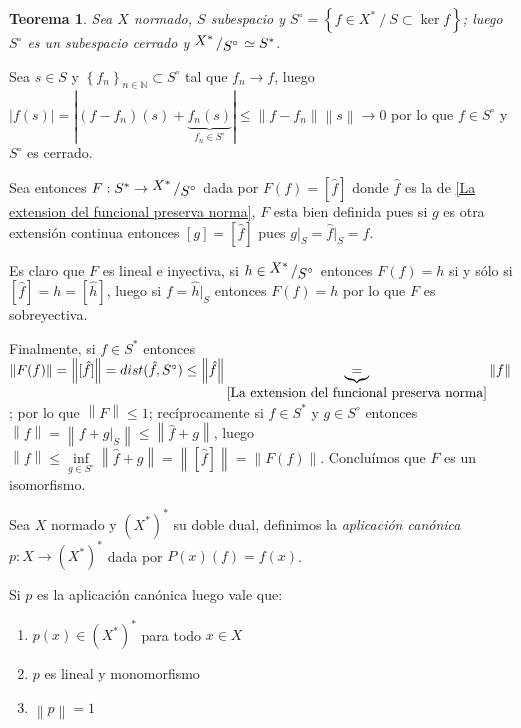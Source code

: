 \documentclass[11pt]{article}
\newcommand{\N}{{\mathbb{N}}}
\newcommand{\ddual}[1]{\left(#1^{\ast}\right)^{\ast}}
\newcommand{\norm}[1]{\left\lVert#1\right\rVert}
\newcommand{\abs}[1]{\left\lvert#1\right\rvert}
\newcommand{\sett}[1]{\left\lbrace#1\right\rbrace}
\newcommand{\quotient}[2]{{\raisebox{.2em}{$#1$}\left/\raisebox{-.2em}{$#2$}\right.}}
\newtheorem{theorem}{Teorema}
\numberwithin{theorem}{subsection}
\newenvironment{proof}[1][Demostraci\'on]{\begin{trivlist}
		\item[\hskip \labelsep {\bfseries #1}]}{\end{trivlist}}
\newenvironment{definition}[1][Definici\'on]{\begin{trivlist}
		\item[\hskip \labelsep {\bfseries #1}]}{\end{trivlist}}
\newenvironment{remark}[1][Observaci\'on]{\begin{trivlist}
		\item[\hskip \labelsep {\bfseries #1}]}{\end{trivlist}}
\newcommand{\qed}{\nobreak \ifvmode \relax \else
	\ifdim\lastskip<1.5em \hskip-\lastskip
	\hskip1.5em plus0em minus0.5em \fi \nobreak
	\vrule height0.75em width0.5em depth0.25em\fi}
\begin{document}
\begin{theorem}
	\label{El dual de un subespacio es el cociente del dual por el polar}
	Sea $X$ normado, $S$ subespacio y $S^{\circ} = \sett{f \in X^{\ast} \ / \ S \subset \ker f}$; luego $S^{\circ}$ es un subespacio cerrado y $\quotient{X^{\ast}}{S^{\circ}} \simeq S^{\ast}$.
\end{theorem}

\begin{proof}
	Sea $s \in S$ y $\sett{f_n}_{n \in \N} \subset S^{\circ}$ tal que $f_n \rightarrow f$, luego $\abs{f(s)} = \abs{(f-f_n)(s) + \underbrace{f_n(s)}_{f_n \in S^{\circ}}} \leq \norm{f-f_n}\norm{s} \rightarrow 0 $ por lo que $f \in S^{\circ}$ y $S^{\circ}$ es cerrado.
	
	Sea entonces $F : S^{\ast} \rightarrow \quotient{X^{\ast}}{S^{\circ}}$ dada por $F(f) = [\hat{f}]$ donde $\hat{f}$ es la de \ref{La extension del funcional preserva norma}, $F$ esta bien definida pues si $g$ es otra extensi\'on continua entonces $[g] = [\hat{f}]$ pues $g \vert_{S} = \hat{f} \vert_{S} = f$.
	
	Es claro que $F$ es lineal e inyectiva, si $h \in \quotient{X^{\ast}}{S^{\circ}}$ entonces $F(f) = h$ si y s\'olo si $[\hat{f}] = h = [\hat{h}]$, luego si $f = \hat{h} \vert_{S}$ entonces $F(f)=h$ por lo que $F$ es sobreyectiva.
	
	Finalmente, si $f \in S^{\ast}$ entonces $\norm{F(f)} = \norm{[\hat{f}]} = dist (\hat{f}, S^{\circ}) \leq \norm{\hat{f}} \underbrace{=}_{\ref{La extension del funcional preserva norma}} \norm{f}$; por lo que $\norm{F} \leq 1$; rec\'iprocamente si $f \in S^{\ast}$ y $g \in S^{\circ}$ entonces $\norm{f} = \norm{f + g \vert_S} \leq \norm{\hat{f} + g}$, luego $\norm{f} \leq \inf\limits_{g \in S^{\circ}}{\norm{\hat{f} + g}} = \norm{[\hat{f}]} = \norm{F(f)}$. Conclu\'imos que $F$ es un isomorfismo.\qed
	
\end{proof}

\begin{definition}
	Sea $X$ normado y $\ddual{X}$ su doble dual, definimos la \textit{aplicaci\'on can\'onica} $p: X \rightarrow \ddual{X}$ dada por $P(x)(f) = f(x)$.
\end{definition}


\begin{remark}
	Si $p$ es la aplicaci\'on can\'onica luego vale que:
	
	\begin{enumerate}
		\item $p(x) \in \ddual{X}$ para todo $x \in X$
		\item $p$ es lineal y monomorfismo
		\item $\norm{p} = 1$
	\end{enumerate}
	
\end{remark}
\end{document}
